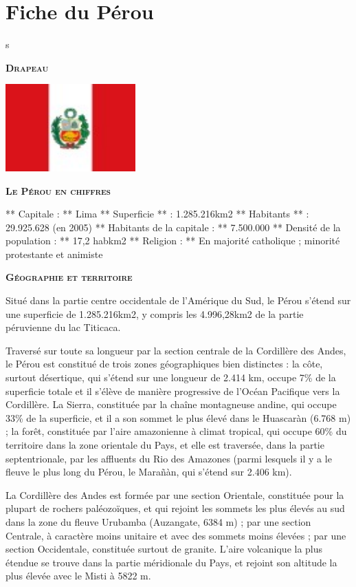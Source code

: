 \section{Fiche du Pérou}
s
\begin{multicols}{2}

\textbf{\textsc{Drapeau}}

\smallbreak
\hspace*{-0.65cm}
\includegraphics[width=5cm]{articles/Fiche-du-perou/1255177646Fug0.jpg}
\smallbreak

\textbf{\textsc{Le Pérou en chiffres}}

** Capitale : ** Lima
** Superficie ** : 1.285.216km2
** Habitants ** : 29.925.628 (en 2005)
** Habitants de la capitale : ** 7.500.000
** Densité de la population : ** 17,2 habkm2
** Religion : ** En majorité catholique ; minorité protestante et animiste

\textbf{\textsc{Géographie et territoire}}

Situé dans la partie centre occidentale de l'Amérique du Sud, le Pérou s'étend sur une superficie de 1.285.216km2, y compris les 4.996,28km2 de la partie péruvienne du lac Titicaca.

Traversé sur toute sa longueur par la section centrale de la Cordillère des Andes, le Pérou est constitué de trois zones géographiques bien distinctes : la côte, surtout désertique, qui s'étend sur une longueur de 2.414 km, occupe 7\% de la superficie totale et il s'élève de manière progressive de l'Océan Pacifique vers la Cordillère. La Sierra, constituée par la chaîne montagneuse andine, qui occupe 33\% de la superficie, et il a son sommet le plus élevé dans le Huascaràn (6.768 m) ; la forêt, constituée par l'aire amazonienne à climat tropical, qui occupe 60\% du territoire dans la zone orientale du Pays, et elle est traversée, dans la partie septentrionale, par les affluents du Rio des Amazones (parmi lesquels il y a le fleuve le plus long du Pérou, le Marañàn, qui s'étend sur 2.406 km).

La Cordillère des Andes est formée par une section Orientale, constituée pour la plupart de rochers paléozoïques, et qui rejoint les sommets les plus élevés au sud dans la zone du fleuve Urubamba (Auzangate, 6384 m) ; par une section Centrale, à caractère moins unitaire et avec des sommets moins élevées ; par une section Occidentale, constituée surtout de granite. L'aire volcanique la plus étendue se trouve dans la partie méridionale du Pays, et rejoint son altitude la plus élevée avec le Misti à 5822 m.


\end{multicols}
